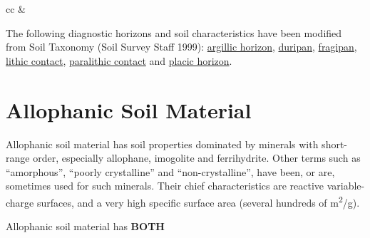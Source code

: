 \documentclass[
  letterpaper,
  DIV=11,
  numbers=noendperiod]{scrreprt}
\begin{document}
\begin{longtable}[c]{cc}
 &  \\




\end{longtable}

The following diagnostic horizons and soil characteristics have been
modified from Soil Taxonomy (Soil Survey Staff 1999):
\protect\hyperlink{sec-diag-argh}{argillic horizon},
\protect\hyperlink{sec-diag-dpan}{duripan},
\protect\hyperlink{sec-diag-fpan}{fragipan},
\protect\hyperlink{sec-diag-lithc}{lithic contact},
\protect\hyperlink{sec-diag-plith}{paralithic contact} and
\protect\hyperlink{sec-diag-plac}{placic horizon}.

\hypertarget{sec-diag-alloph}{%
\section{Allophanic Soil Material}\label{sec-diag-alloph}}

Allophanic soil material has soil properties dominated by minerals with
short-range order, especially allophane, imogolite and ferrihydrite.
Other terms such as ``amorphous'', ``poorly crystalline'' and
``non-crystalline'', have been, or are, sometimes used for such
minerals. Their chief characteristics are reactive variable-charge
surfaces, and a very high specific surface area (several hundreds of
m\textsuperscript{2}/g).

Allophanic soil material has \textbf{BOTH}
\end{document}
